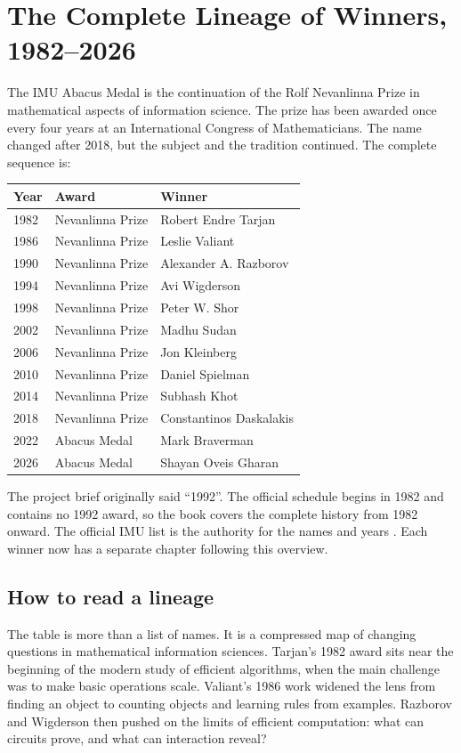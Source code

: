 \chapter{The Complete Lineage of Winners, 1982--2026}
\label{chap:all-winners}
\targetchapterspacing
{}

The IMU Abacus Medal is the continuation of the Rolf Nevanlinna Prize in mathematical aspects of information science. The prize has been awarded once every four years at an International Congress of Mathematicians. The name changed after 2018, but the subject and the tradition continued. The complete sequence is:

\begin{center}
\begin{tabular}{lll}
\toprule
Year & Award & Winner \\
\midrule
1982 & Nevanlinna Prize & Robert Endre Tarjan \\
1986 & Nevanlinna Prize & Leslie Valiant \\
1990 & Nevanlinna Prize & Alexander A. Razborov \\
1994 & Nevanlinna Prize & Avi Wigderson \\
1998 & Nevanlinna Prize & Peter W. Shor \\
2002 & Nevanlinna Prize & Madhu Sudan \\
2006 & Nevanlinna Prize & Jon Kleinberg \\
2010 & Nevanlinna Prize & Daniel Spielman \\
2014 & Nevanlinna Prize & Subhash Khot \\
2018 & Nevanlinna Prize & Constantinos Daskalakis \\
2022 & Abacus Medal & Mark Braverman \\
2026 & Abacus Medal & Shayan Oveis Gharan \\
\bottomrule
\end{tabular}
\end{center}

The project brief originally said ``1992''. The official schedule begins in 1982 and contains no 1992 award, so the book covers the complete history from 1982 onward. The official IMU list is the authority for the names and years \cite{imu-history}. Each winner now has a separate chapter following this overview.

\section{How to read a lineage}
The table is more than a list of names. It is a compressed map of changing questions in mathematical information sciences. Tarjan's 1982 award sits near the beginning of the modern study of efficient algorithms, when the main challenge was to make basic operations scale. Valiant's 1986 work widened the lens from finding an object to counting objects and learning rules from examples. Razborov and Wigderson then pushed on the limits of efficient computation: what can circuits prove, and what can interaction reveal?

